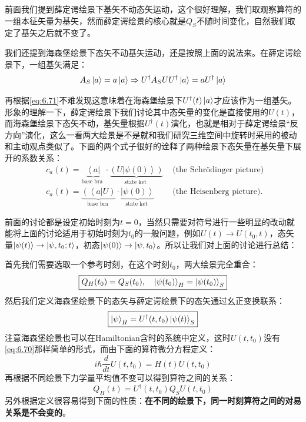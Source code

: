 \documentclass[a4paper,zihao=-4,linespread=1]{ctexrep}
\begin{document}
	前面我们提到薛定谔绘景下基矢不动态矢运动，这个很好理解，我们取观察算符的一组本征矢量为基矢，然而薛定谔绘景的核心就是$Q_S$不随时间变化，自然我们取定了基矢之后就不变了。
	
	我们还提到海森堡绘景下态矢不动基矢运动，还是按照上面的说法来。在薛定谔绘景下，一组基矢满足：
	\[A_S\ket{a}=a\ket{a}\Rightarrow U^\dagger A_SU U^\dagger\ket{a}=aU^\dagger\ket{a}\]
	
	再根据\ref{eq:6.71}不难发现这意味着在海森堡绘景下$U^\dagger(t)\ket{a}$才应该作为一组基矢。形象的理解一下，薛定谔绘景下我们讨论其中态矢量的变化是直接使用的$U(t)$，而海森堡绘景下态矢不动，基矢量根据$U^\dagger (t)$演化，也就是相对于薛定谔绘景“反方向”演化，这么一看两大绘景是不是就和我们研究三维空间中旋转时采用的被动和主动观点类似了。下面的两个式子很好的诠释了两种绘景下态矢量在基矢量下展开的系数关系：
	\begin{align*}
		&c_{a}(t)=\underbrace{\left\langle a\right|}_{\text {base bra }} \cdot \underbrace{\left({U}\left|\psi(0)\right\rangle\right)}_{\text {state ket }} &\text { (the Schrödinger picture) } \\
		&c_{a}(t)=\underbrace{\left(\left\langle a\right| {U}\right)}_{\text {base bra }} \cdot \underbrace{\left|\psi(0)\right\rangle}_{\text {state ket }} & \text { (the Heisenberg picture). }
	\end{align*}
	
	前面的讨论都是设定初始时刻为$t=0$，当然只需要对符号进行一些明显的改动就能将上面的讨论适用于初始时刻为$t_0$的一般问题，例如$U(t)\rightarrow U(t_0,t)$，态矢量$\ket{\psi(t)}\rightarrow\ket{\psi,t_0;t}$，初态$\ket{\psi(0)}\rightarrow\ket{\psi,t_0}$。所以让我们对上面的讨论进行总结：
	
	首先我们需要选取一个参考时刻，在这个时刻$t_0$，两大绘景完全重合：
	\begin{equation}
		\boxed{Q_H(t_0)=Q_S(t_0),\quad\ket{\psi(t_0)}_H=\ket{\psi(t_0)}_S}
	\end{equation}
	然后我们定义海森堡绘景下的态矢与薛定谔绘景下的态矢通过幺正变换联系：
	\begin{equation}
		\boxed{\ket{\psi}_H=U^\dagger(t,t_0)\ket{\psi(t)}_S}
	\end{equation}
	注意海森堡绘景也可以在Hamiltonian含时的系统中定义，这时$U(t,t_0)$没有\ref{eq:6.70}那样简单的形式，而由下面的算符微分方程定义：
	\begin{equation}
		i\hbar\frac{d}{dt}U(t,t_0)=H(t)U(t,t_0)
	\end{equation}
	再根据不同绘景下力学量平均值不变可以得到算符之间的关系：
	\begin{equation}
		\boxed{
			Q_H(t)=U^\dagger(t,t_0)Q_SU(t,t_0)
		}
	\end{equation}
	另外根据定义很容易得到下面的性质：\textbf{在不同的绘景下，同一时刻算符之间的对易关系是不会变的}。
\end{document}
